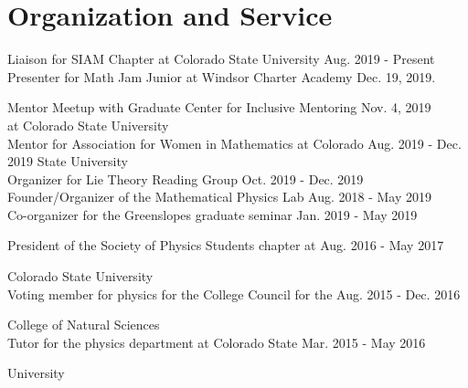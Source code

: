 \documentclass[12pt]{article} %
\begin{document}
\section{Organization and Service}
\begin{flushleft}
Liaison for SIAM Chapter at Colorado State University \hfill Aug. 2019 - Present\\
\vspace*{5pt}
Presenter for Math Jam Junior at Windsor Charter Academy \hfill Dec. 19, 2019.\\
\vspace*{5pt}	

Mentor Meetup with Graduate Center for Inclusive Mentoring \hfill Nov. 4, 2019\\

\noindent  at Colorado State University\\
\vspace*{5pt}
Mentor for Association for Women in Mathematics at Colorado \hfill Aug. 2019 - Dec. 2019
\noindent  State University\\
\vspace*{5pt}
Organizer for Lie Theory Reading Group \hfill Oct. 2019 - Dec. 2019\\
\vspace*{5pt}
Founder/Organizer of the Mathematical Physics Lab \hfill Aug. 2018 - May 2019\\
\vspace*{5pt}
Co-organizer for the Greenslopes graduate seminar \hfill Jan. 2019 - May 2019\\
\vspace*{5pt}

President of the Society of Physics Students chapter at \hfill Aug. 2016 - May 2017

\noindent Colorado State University\\
\vspace*{5pt}
Voting member for physics for the College Council for the \hfill Aug. 2015 - Dec. 2016

\noindent College of Natural Sciences\\
\vspace*{5pt}
Tutor for the physics department at Colorado State \hfill Mar. 2015 - May 2016

\noindent University
\end{flushleft}
\noindent\makebox[\textwidth]{\rule{\textwidth}{0.5mm}}
\end{document}
